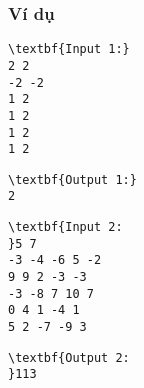 \subsubsection{Ví dụ}
\begin{itemize}
\end{itemize}
\begin{verbatim}
\textbf{Input 1:}
2 2
-2 -2
1 2
1 2
1 2
1 2 \end{verbatim}
\begin{verbatim}
\textbf{Output 1:}
2
\end{verbatim}
\begin{verbatim}
\textbf{Input 2:
}5 7
-3 -4 -6 5 -2
9 9 2 -3 -3
-3 -8 7 10 7
0 4 1 -4 1
5 2 -7 -9 3
\end{verbatim}
\begin{verbatim}
\textbf{Output 2:
}113\end{verbatim}
